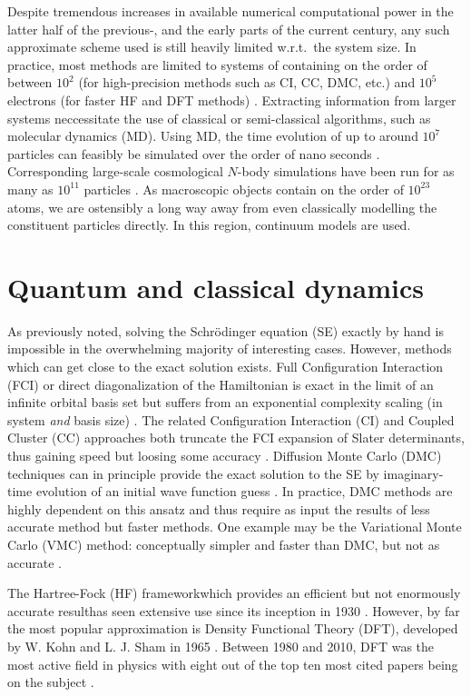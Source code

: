 \documentclass[twoside,english]{uiofysmaster}
\renewcommand{\comment}[1]{\ignorespaces}
\begin{document}
Despite tremendous increases in available numerical computational power in the latter half of the previous-, and the early parts of the current century, any such approximate scheme used is still heavily limited w.r.t.\ the system size. In practice, most methods are limited to systems of containing on the order of between $10^2$ (for high-precision methods such as CI, CC, DMC, etc.) and $10^5$ electrons (for faster HF and DFT methods) \cite{hu,bowler,vandevondele}. Extracting information from larger systems neccessitate the use of classical or semi-classical algorithms, such as molecular dynamics (MD). Using MD, the time evolution of up to around $10^7$ particles can feasibly be simulated over the order of nano seconds \cite{Zhao2013,Reddy}. Corresponding large-scale cosmological $N$-body simulations have been run for as many as $10^{11}$ particles \cite{angulo,kim}. As macroscopic objects contain on the order of $10^{23}$ atoms, we are ostensibly a long way away from even classically modelling the constituent particles directly. In this region, continuum models are used.


\section{Quantum and classical dynamics}
As previously noted, solving the Schrödinger equation (SE) exactly 
by hand is impossible in the overwhelming majority of interesting cases. However, methods which can get close to the exact solution exists. Full Configuration Interaction (FCI) or direct diagonalization of the Hamiltonian is exact in the limit of an infinite orbital basis set but suffers from an exponential complexity scaling (in system \emph{and} basis size) \cite{helgaker}\comment{p525}. The related Configuration Interaction (CI) and Coupled Cluster (CC) approaches both truncate the FCI expansion of Slater determinants, thus gaining speed but loosing some accuracy \cite{kvaal,shavitt}\comment{ch6.3 ,ch 9}. Diffusion Monte Carlo (DMC) techniques can in principle provide the exact solution to the SE by imaginary-time evolution of an initial wave function guess \cite{hjorthjensen,hammond}\comment{p537,p87}. In practice, DMC methods are highly dependent on this ansatz and thus require as input the results of less accurate method but faster methods. One example may be the Variational Monte Carlo (VMC) method: conceptually simpler and faster than DMC, but not as accurate \cite{hammond,conroy,anderson}.

The Hartree-Fock (HF) framework\textemdash which provides an efficient but not enormously accurate result\textemdash has seen extensive use since its inception in 1930 \cite{hartree,fock,szabo}. However, by far the most popular approximation is Density Functional Theory (DFT), developed by W. Kohn and L. J. Sham in 1965 \cite{kohnsham,martin}. Between 1980 and 2010, DFT was the most active field in physics with eight out of the top ten most cited papers being on the subject \cite{dftperspective}.
\end{document}
